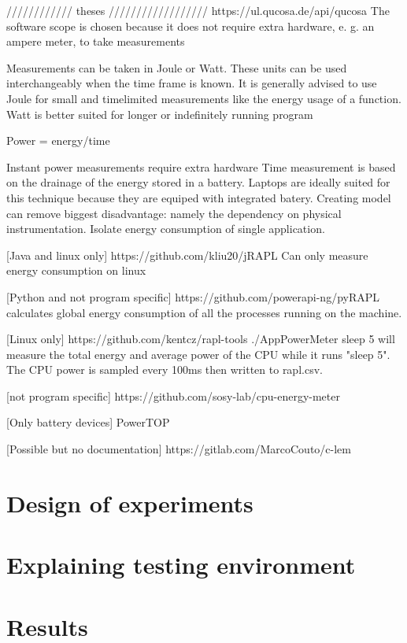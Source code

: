\documentclass[../theses.tex]{subfiles}
\begin{document}
//////////// theses //////////////////
https://ul.qucosa.de/api/qucosa%
The software scope is chosen because it does not require extra hardware,
e. g. an ampere meter, to take measurements

Measurements can be taken in Joule or Watt. These units can be used interchangeably
when the time frame is known. It is generally advised to use Joule for small and timelimited measurements like the energy usage of a function. Watt is better suited for
longer or indefinitely running program

Power = energy/time

Instant power measurements require extra hardware
Time measurement is based on the drainage of the energy stored in a battery. Laptops are ideally suited for this technique because they are equiped with integrated batery.
Creating model can remove biggest disadvantage: namely the dependency on physical instrumentation. Isolate energy consumption of single application.  

[Java and linux only]
https://github.com/kliu20/jRAPL
Can only measure energy consumption on linux

[Python and not program specific]
https://github.com/powerapi-ng/pyRAPL
calculates global energy consumption of all the processes running on the machine. 

[Linux only]
https://github.com/kentcz/rapl-tools
./AppPowerMeter sleep 5
will measure the total energy and average power of the CPU while it runs "sleep 5". The CPU power is sampled every 100ms then written to rapl.csv.

[not program specific]
https://github.com/sosy-lab/cpu-energy-meter

[Only battery devices]
PowerTOP

[Possible but no documentation]
https://gitlab.com/MarcoCouto/c-lem
\section{Design of experiments}
\section{Explaining testing environment}
\section{Results}
\end{document}
